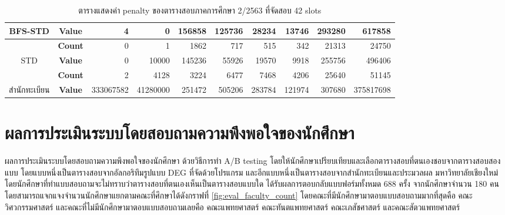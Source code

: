 \begin{table}[]
{\begin{tabular}{@{}ccrrrrrrrr@{}}
    \multirow{-2}{*}{BFS-STD}                    & \textbf{Value}                        & 4                        & 0                        & 156858                        & 125736                       & 28234                        & 13746                        & 293280                        & 617858                        \\ \midrule
                                                 & \textbf{Count}                        & 0                        & 1                        & 1862                          & 717                          & 515                          & 342                          & 21313                         & 24750                         \\ \cmidrule(l){2-10} 
    \multirow{-2}{*}{STD}                        & \textbf{Value}                        & 0                        & 10000                    & 145236                        & 55926                        & 19570                        & 9918                         & 255756                        & 496406                        \\ \midrule
                                                 & \textbf{Count}                        & 2                        & 4128                     & 3224                          & 6477                         & 7468                         & 4206                         & 25640                         & 51145                         \\ \cmidrule(l){2-10} 
    \multirow{-2}{*}{สำนักทะเบียน}               & \textbf{Value}                          & 333067582                 & 41280000                 & 251472                        & 505206                       & 283784                       & 121974                       & 307680                        & 375817698                     \\ \bottomrule
    \end{tabular}%
    }
    \caption{ตารางแสดงค่า penalty ของตารางสอบภาคการศึกษา 2/2563 ที่จัดสอบ 42 slots}
    \label{tab:result_table_263}
\end{table}

\clearpage
\section{ผลการประเมินระบบโดยสอบถามความพึงพอใจของนักศึกษา}
ผลการประเมินระบบโดยสอบถามความพึงพอใจของนักศึกษา ด้วยวิธีการทำ A/B testing 
โดยให้นักศึกษาเปรียบเทียบและเลือกตารางสอบที่ตนเองชอบจากตารางสอบสองแบบ โดยแบบหนึ่งเป็นตารางสอบจากอัลกอริทึมรูปแบบ DEG ที่จัดด้วยโปรแกรม
และอีกแบบหนึ่งเป็นตารางสอบจากสำนักทะเบียนและประมวลผล มหาวิทยาลัยเชียงใหม่ โดยนักศึกษาที่ทำแบบสอบถามจะไม่ทราบว่าตารางสอบที่ตนเองเห็นเป็นตารางสอบแบบใด 
ได้รับผลการตอบกลับแบบฟอร์มทั้งหมด 688 ครั้ง จากนักศึกษาจำนวน 180 คน โดยสามารถแจกแจงจำนวนนักศึกษาแยกตามคณะที่ศึกษาได้ดังกราฟที่ \ref{fig:eval_faculty_count}
โดยคณะที่มีนักศึกษามาตอบแบบสอบถามมากที่สุดคือ คณะวิศวกรรมศาสตร์ และคณะที่ไม่มีนักศึกษามาตอบแบบสอบถามเลยคือ คณะแพทยศาสตร์ คณะทันตแพทยศาสตร์ คณะเภสัชศาสตร์ และคณะสัตวแพทยศาสตร์

